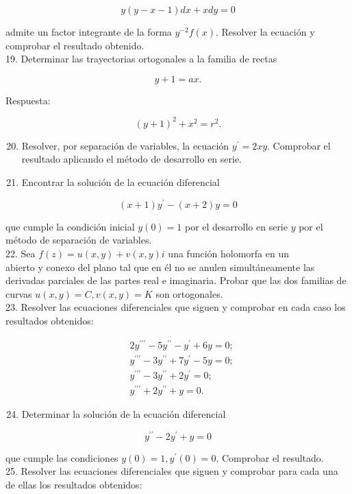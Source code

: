 \documentclass[10pt]{article}
\theoremstyle{plain}
\theoremstyle{definition}
\theoremstyle{remark}
\begin{document}
$$
y(y-x-1) d x+x d y=0
$$

admite un factor integrante de la forma $y^{-2} f(x)$. Resolver la ecuación y comprobar el resultado obtenido.\\
19. Determinar las trayectorias ortogonales a la familia de rectas

$$
y+1=a x .
$$

Respuesta:

$$
(y+1)^{2}+x^{2}=r^{2} .
$$

\begin{enumerate}
  \setcounter{enumi}{19}
  \item Resolver, por separación de variables, la ecuación $y^{\prime}=2 x y$. Comprobar el resultado aplicando el método de desarrollo en serie.
  \item Encontrar la solución de la ecuación diferencial
\end{enumerate}

$$
(x+1) y^{\prime}-(x+2) y=0
$$

que cumple la condición inicial $y(0)=1$ por el desarrollo en serie $y$ por el método de separación de variables.\\
22. Sea $f(z)=u(x, y)+v(x, y) i$ una función holomorfa en un\\
abierto y conexo del plano tal que en él no se anulen simultáneamente las derivadas parciales de las partes real e imaginaria. Probar que las dos familias de curvas $u(x, y)=C, v(x, y)=K$ son ortogonales.\\
23. Resolver las ecuaciones diferenciales que siguen y comprobar en cada caso los resultados obtenidos:

$$
\begin{aligned}
& 2 y^{\prime \prime \prime}-5 y^{\prime \prime}-y^{\prime}+6 y=0 ; \\
& y^{\prime \prime \prime}-3 y^{\prime \prime}+7 y^{\prime}-5 y=0 ; \\
& y^{\prime \prime \prime}-3 y^{\prime \prime}+2 y^{\prime}=0 ; \\
& y^{\prime \prime \prime}+2 y^{\prime \prime}+y=0 .
\end{aligned}
$$

\begin{enumerate}
  \setcounter{enumi}{23}
  \item Determinar la solución de la ecuación diferencial
\end{enumerate}

$$
y^{\prime \prime}-2 y^{\prime}+y=0
$$

que cumple las condiciones $y(0)=1, y^{\prime}(0)=0$. Comprobar el resultado.\\
25. Resolver las ecuaciones diferenciales que siguen y comprobar para cada una de ellas los resultados obtenidos:
\end{document}
